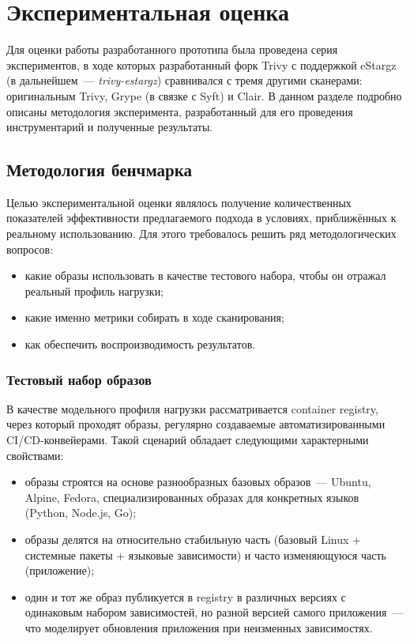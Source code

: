\section{Экспериментальная оценка}
\label{sec:Chapter5} 

Для оценки работы разработанного прототипа была проведена серия экспериментов, в ходе которых разработанный форк Trivy с поддержкой eStargz (в дальнейшем~--- \textit{trivy-estargz}) сравнивался с тремя другими сканерами: оригинальным Trivy, Grype (в связке с Syft) и Clair. В данном разделе подробно описаны методология эксперимента, разработанный для его проведения инструментарий и полученные результаты.

\subsection{Методология бенчмарка}

Целью экспериментальной оценки являлось получение количественных показателей эффективности предлагаемого подхода в условиях, приближённых к реальному использованию. Для этого требовалось решить ряд методологических вопросов:

\begin{itemize}
\item какие образы использовать в качестве тестового набора, чтобы он отражал реальный профиль нагрузки;
\item какие именно метрики собирать в ходе сканирования;
\item как обеспечить воспроизводимость результатов.
\end{itemize}

\subsubsection{Тестовый набор образов}
\label{subsubsec:test-set}

В качестве модельного профиля нагрузки рассматривается container registry, через который проходят образы, регулярно создаваемые автоматизированными CI/CD-конвейерами. Такой сценарий обладает следующими характерными свойствами:

\begin{itemize}
\item образы строятся на основе разнообразных базовых образов~--- Ubuntu, Alpine, Fedora, специализированных образах для конкретных языков (Python, Node.js, Go);
\item образы делятся на относительно стабильную часть (базовый Linux + системные пакеты + языковые зависимости) и часто изменяющуюся часть (приложение);
\item один и тот же образ публикуется в registry в различных версиях с одинаковым набором зависимостей, но разной версией самого приложения~--- что моделирует обновления приложения при неизменных зависимостях.
\end{itemize}

